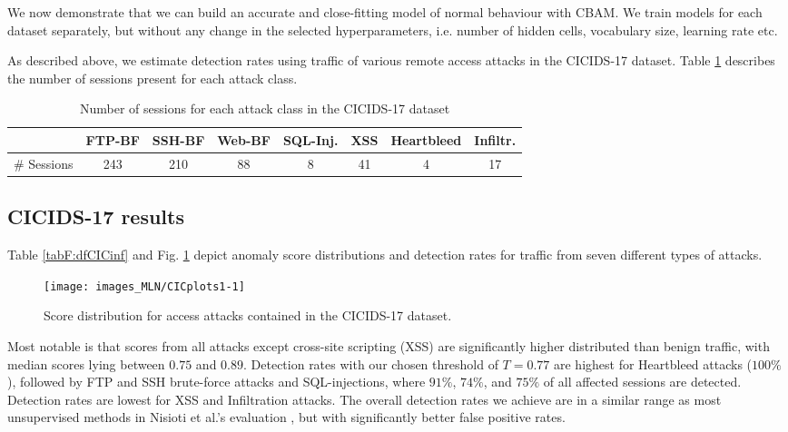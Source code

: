 We now demonstrate that we can build an accurate and close-fitting model of normal behaviour with CBAM. We train models for each dataset separately, but without any change in the selected hyperparameters, i.e. number of hidden cells, vocabulary size, learning rate etc. 

As described above, we estimate detection rates using traffic of various remote access attacks in the CICIDS-17 dataset. Table \ref{tabF:Attackdata} describes the number of sessions present for each attack class.

\begin{table}[ht]
\centering
\small
\begin{tabular}{l|ccccccc}
&FTP-BF&SSH-BF&Web-BF&SQL-Inj.&XSS&Heartbleed&Infiltr.\\
\hline
\# Sessions&243&210&88&8&41&4&17\\[0.2cm]
\end{tabular}
\vspace{2pt}
\caption{Number of sessions for each attack class in the CICIDS-17 dataset}\label{tabF:Attackdata}
\end{table}

\subsection{CICIDS-17 results}\label{SecF:DetCIC}


Table \ref{tabF:dfCICinf} and Fig. \ref{figF:CICplots1} 
depict anomaly score distributions and detection rates for traffic from seven different types of attacks.


\begin{figure}[ht]
\begin{center}
\texttt{[image: images\_MLN/CICplots1-1]} 
\vspace{-0.5cm}
\caption[Score distribution for various access attacks contained in the CICIDS-17 dataset, along with our detection threshold]{Score distribution for access attacks contained in the CICIDS-17 dataset.}\label{figF:CICplots1}
\end{center}
\end{figure}

Most notable is that scores from all attacks except cross-site scripting (XSS) are significantly higher distributed than benign traffic, with median scores lying between $0.75$ and $0.89$. Detection rates with our chosen threshold of $T=0.77$ are highest for Heartbleed attacks ($100\%$), followed by FTP and SSH brute-force attacks and SQL-injections, where $91\%$, $74\%$, and $75\%$ of all affected sessions are detected. Detection rates are lowest for XSS and Infiltration attacks. The overall detection rates we achieve are in a similar range as most unsupervised methods in Nisioti et al.'s evaluation \cite{nisioti2018intrusion}, but with significantly better false positive rates.




